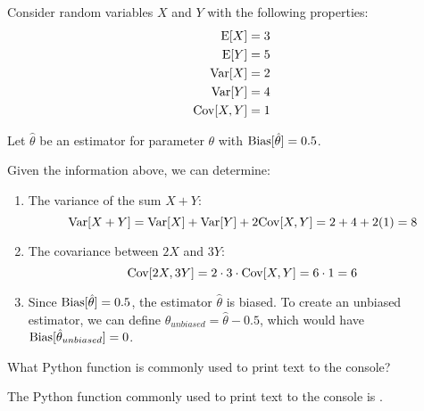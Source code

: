 \documentclass[12pt]{article}
\begin{document}
\begin{homeworkProblem}
    Consider random variables $X$ and $Y$ with the following properties:
    \begin{align}
        \mathrm{E}[X] &= 3 \\
        \mathrm{E}[Y] &= 5 \\
        \mathrm{Var}[X] &= 2 \\
        \mathrm{Var}[Y] &= 4 \\
        \mathrm{Cov}[X,Y] &= 1
    \end{align}
    
    Let $\hat{\theta}$ be an estimator for parameter $\theta$ with $\mathrm{Bias}[\hat{\theta}] = 0.5$.
    
    \solution{}
    
    Given the information above, we can determine:
    
    \begin{enumerate}
        \item The variance of the sum $X + Y$:
        \begin{equation}
            \mathrm{Var}[X + Y] = \mathrm{Var}[X] + \mathrm{Var}[Y] + 2\mathrm{Cov}[X,Y] = 2 + 4 + 2(1) = 8
        \end{equation}
        
        \item The covariance between $2X$ and $3Y$:
        \begin{equation}
            \mathrm{Cov}[2X, 3Y] = 2 \cdot 3 \cdot \mathrm{Cov}[X,Y] = 6 \cdot 1 = 6
        \end{equation}
        
        \item Since $\mathrm{Bias}[\hat{\theta}] = 0.5$, the estimator $\hat{\theta}$ is biased. To create an unbiased estimator, we can define $\hat{\theta}_{unbiased} = \hat{\theta} - 0.5$, which would have $\mathrm{Bias}[\hat{\theta}_{unbiased}] = 0$.
    \end{enumerate}
\end{homeworkProblem}
\begin{homeworkProblem}
    What Python function is commonly used to print text to the console?
    
    \solution{}
    
    The Python function commonly used to print text to the console is .
\end{homeworkProblem}
\end{document}
